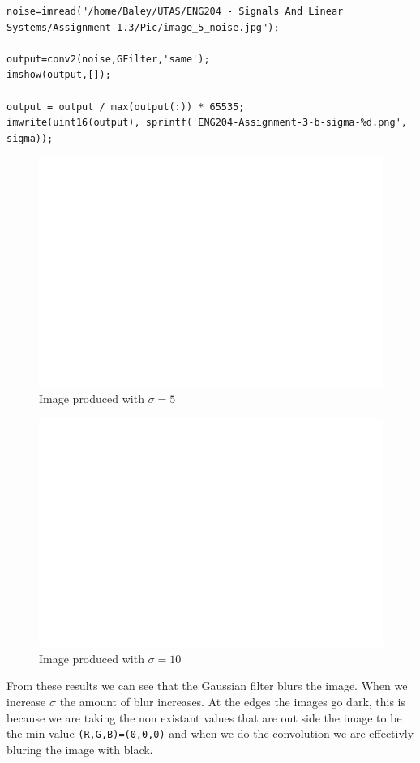 \documentclass[11pt]{article}
\begin{document}
\begin{verbatim}
noise=imread("/home/Baley/UTAS/ENG204 - Signals And Linear Systems/Assignment 1.3/Pic/image_5_noise.jpg");

output=conv2(noise,GFilter,'same');
imshow(output,[]);

output = output / max(output(:)) * 65535;
imwrite(uint16(output), sprintf('ENG204-Assignment-3-b-sigma-%d.png', sigma));
\end{verbatim}


\begin{FIGURE}
\begin{figure}[htbp]
\centering
\includegraphics[width=.9\linewidth]{ENG204-Assignment-3-b-sigma-5.png}
\caption{Image produced with \(\sigma=5\)}
\end{figure}
\end{FIGURE}

\begin{FIGURE}
\begin{figure}[htbp]
\centering
\includegraphics[width=.9\linewidth]{ENG204-Assignment-3-b-sigma-10.png}
\caption{Image produced with \(\sigma=10\)}
\end{figure}
\end{FIGURE}
From these results we can see that the Gaussian filter blurs the image. When we increase \(\sigma\) the amount of blur increases.
At the edges the images go dark, this is because we are taking the non existant values that are out side the image to be the min value \texttt{(R,G,B)=(0,0,0)} and when we do the convolution we are effectivly bluring the image with black.
\end{document}
